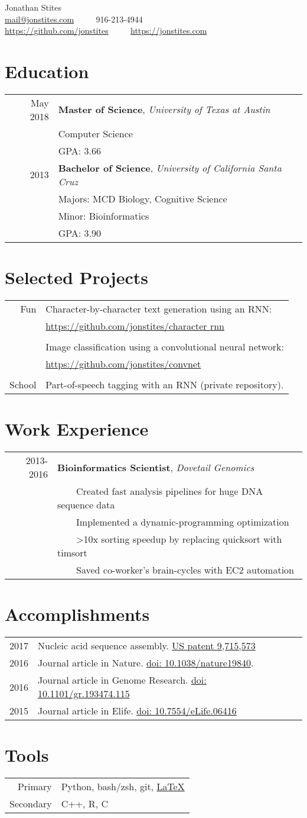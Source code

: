\documentclass[12pt]{extarticle}
\makeatletter
\newcommand{\tabitem}{~~\llap{\textbullet}~~}
\newcommand*{\email}{
	\href{mailto:mail+resume@jonstites.com }{mail@jonstites.com}
	}
\newcommand*{\phone}{
	916-213-4944
	}
\newcommand*{\github}{
	{\href{https://github.com/jonstites}{https://github.com/jonstites}}
}
\newcommand*{\website}{
	{\href{https://jonstites.com}{https://jonstites.com}}
}
\newcommand*{\charrnn}{
	Character-by-character text generation using an RNN: \\
	& {\href{https://github.com/jonstites/character_rnn}{https://github.com/jonstites/character \textunderscore rnn}}
}
\newcommand*{\convnet}{
	Image classification using a convolutional neural network: \\
	& {\href{https://github.com/jonstites/convnet}{https://github.com/jonstites/convnet}}
}
\newcommand*{\postagging}{
	Part-of-speech tagging with an RNN (private repository).
}
\newcommand*{\Contact}{
	\begin{center}
		\Huge Jonathan Stites \\
	    \small \email \tabitem \phone \\
	    \github \tabitem \website \\
	\end{center}
}
\newcommand*{\Education}{
	\section{Education}
	\begin{tabular}{rl}
		May 2018  & \textbf{Master of Science}, \textit{University of Texas at Austin} \\
				  & Computer Science \\
          		  & GPA: 3.66 \\
		2013 	  & \textbf{Bachelor of Science}, \textit{University of California Santa Cruz} \\
				  & Majors: MCD Biology, Cognitive Science \\
		  		  & Minor: Bioinformatics \\
				  & GPA: 3.90 \\
\end{tabular}
}
\newcommand*{\Projects}{
	\section{Selected Projects}
	\begin{tabular}{rl}
	Fun & \charrnn \\ \\
		& \convnet \\ \\
	School & \postagging \\
	\end{tabular}
}
\newcommand*{\Tools}{
	\section{Tools}
	\begin{tabular}{rl}
	Primary   & Python, bash/zsh, git, 
			  \href{http://stevehanov.ca/blog/resume_comic.png}{\LaTeX} \\
	Secondary & C++, R, C \\
	\end{tabular}
}
\newcommand*{\Work}{
	\section{Work Experience}
	\begin{tabular}{rl}
	2013-2016 & \textbf{Bioinformatics Scientist}, 
			    \textit{Dovetail Genomics} \\
	   & \tabitem Created fast analysis pipelines for huge DNA sequence data \\
	   & \tabitem Implemented a dynamic-programming optimization \\
	   & \tabitem >10x sorting speedup by replacing quicksort with timsort \\
	   & \tabitem Saved co-worker's brain-cycles with EC2 automation \\

	\end{tabular}
}
\newcommand*{\Accomplishments}{
	\section{Accomplishments}
	\begin{tabular}{rl}
	2017 & Nucleic acid sequence assembly.
	\href{https://patents.google.com/patent/US9715573B2}
	{US patent 9,715,573} \\
	2016 & 
	Journal article in Nature.
	\href{https://www.ncbi.nlm.nih.gov/pubmed/27762356}
	{doi: 10.1038/nature19840}. \\
	2016 & 
	Journal article in Genome Research.
	\href{https://www.ncbi.nlm.nih.gov/pubmed/26848124}
	{doi: 10.1101/gr.193474.115} \\
	2015 & 
	Journal article in Elife.
	\href{https://www.ncbi.nlm.nih.gov/pubmed/25919952}
	{doi: 10.7554/eLife.06416}
	\end{tabular}
}
\makeatother
\begin{document}
\Contact
\Education
\Projects
\Work
\Accomplishments
\Tools
\end{document}
